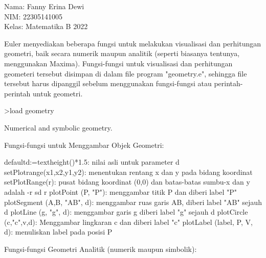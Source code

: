 \documentclass[12pt,arial,letterpaper]{book}
\begin{document}
\begin{eulernootebook}
\begin{eulercomment}
\begin{eulercomment}
\begin{eulernootebook}
\begin{eulercomment}
\begin{eulercomment}
\begin{eulercomment}
\begin{eulercomment}
\begin{eulercomment}
\begin{eulercomment}
\begin{eulernotebook}
\eulersubheading{}
\begin{eulercomment}
Nama: Fanny Erina Dewi\\
NIM: 22305141005\\
Kelas: Matematika B 2022\\
\end{eulercomment}
\eulersubheading{}
\begin{eulercomment}
\begin{eulercomment}
\begin{eulercomment}
Euler menyediakan beberapa fungsi untuk melakukan visualisasi dan
perhitungan geometri, baik secara numerik maupun analitik (seperti
biasanya tentunya, menggunakan Maxima). Fungsi-fungsi untuk
visualisasi dan perhitungan geometeri tersebut disimpan di dalam file
program "geometry.e", sehingga file tersebut harus dipanggil sebelum
menggunakan fungsi-fungsi atau perintah-perintah untuk geometri.
\end{eulercomment}
\begin{eulerprompt}
>load geometry
\end{eulerprompt}
\begin{euleroutput}
  Numerical and symbolic geometry.
\end{euleroutput}
\begin{eulercomment}
Fungsi-fungsi untuk Menggambar Objek Geometri:

\end{eulercomment}
\begin{eulerttcomment}
  defaultd:=textheight()*1.5: nilai asli untuk parameter d
  setPlotrange(x1,x2,y1,y2): menentukan rentang x dan y pada bidang koordinat
  setPlotRange(r): pusat bidang koordinat (0,0) dan batas-batas sumbu-x dan y adalah -r sd r
  plotPoint (P, "P"): menggambar titik P dan diberi label "P"
  plotSegment (A,B, "AB", d): menggambar ruas garis AB, diberi label "AB" sejauh d
  plotLine (g, "g", d): menggambar garis g diberi label "g" sejauh d
  plotCircle (c,"c",v,d): Menggambar lingkaran c dan diberi label "c"
  plotLabel (label, P, V, d): menuliskan label pada posisi P
\end{eulerttcomment}
\begin{eulercomment}

Fungsi-fungsi Geometri Analitik (numerik maupun simbolik):


\end{eulercomment}
\end{eulercomment}
\end{eulercomment}
\end{eulernotebook}
\end{eulercomment}
\end{eulercomment}
\end{eulercomment}
\end{eulercomment}
\end{eulercomment}
\end{eulercomment}
\end{eulernootebook}
\end{eulercomment}
\end{eulercomment}
\end{eulernootebook}
\end{document}
